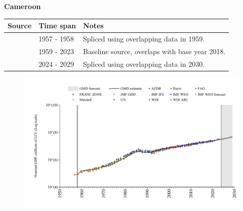 \documentclass[12pt,a4paper,landscape]{article}
\begin{document}
\begin{adjustbox}{max totalsize={\paperwidth}{\paperheight},center}
\begin{minipage}[t][\textheight][t]{\textwidth}
\vspace*{0.5cm}
{}
\begin{center}
{\Large\bfseries Cameroon}
\end{center}
\vspace{0.5cm}
\begin{table}[H]
\centering
\small
\begin{tabular}{|l|l|l|}
\hline
\textbf{Source} & \textbf{Time span} & \textbf{Notes} \\
\hline
\rowcolor{white}\cite{Mitchell}& 1957 - 1958 &Spliced using overlapping data in 1959.\\
\rowcolor{lightgray}\cite{WDI}& 1959 - 2023 &Baseline source, overlaps with base year 2018.\\
\rowcolor{white}\cite{IMF_WEO_forecast}& 2024 - 2029 &Spliced using overlapping data in 2030.\\
\hline
\end{tabular}
\end{table}
\begin{figure}[H]
\centering
\includegraphics[width=\textwidth,height=0.6\textheight,keepaspectratio]{graphs/CMR_nGDP.pdf}
\end{figure}
\end{minipage}
\end{adjustbox}
\end{document}
